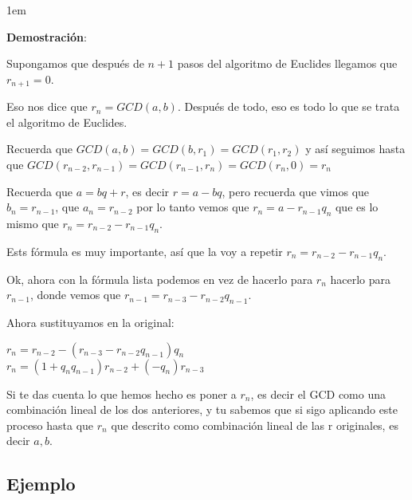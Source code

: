 \documentclass[12pt, fleqn]{report}                             %
\newenvironment{SmallIndentation}[1][0.75em]                    %
    {\begin{adjustwidth}{#1}{}\begin{footnotesize}}                 %
    {\end{footnotesize}\end{adjustwidth}}                           %
\begin{document}
            \begin{SmallIndentation}[1em]
                \textbf{Demostración}:

                Supongamos que después de $n+1$ pasos del algoritmo de Euclides llegamos que
                $r_{n+1}=0$.

                Eso nos dice que $r_n=GCD(a,b)$. Después de todo, eso es todo lo que se
                trata el algoritmo de Euclides.

                Recuerda que $GCD(a,b) = GCD(b,r_1) = GCD(r_1,r_2)$ y así seguimos hasta que
                $GCD(r_{n-2},r_{n-1}) = GCD(r_{n-1},r_n) = GCD(r_n,0) = r_n$

                Recuerda que $a=bq+r$, es decir $r=a-bq$, pero recuerda que vimos que
                $b_n = r_{n-1}$, que $a_n=r_{n-2}$ por lo tanto vemos que
                $r_n=a-r_{n-1}q_n$ que es lo mismo que  $r_n = r_{n-2} - r_{n-1}q_n$.

                Ests fórmula es muy importante, así que la voy a repetir $r_n = r_{n-2} - r_{n-1}q_n$.

                Ok, ahora con la fórmula lista podemos en vez de hacerlo para $r_n$ hacerlo para
                $r_{n-1}$, donde vemos que $r_{n-1} = r_{n-3} - r_{n-2}q_{n-1}$.

                Ahora sustituyamos en la original:

                $r_n = r_{n-2} - (r_{n-3} - r_{n-2}q_{n-1})q_n$\\
                $r_n = (1+q_n q_{n-1})r_{n-2} + (-q_n)r_{n-3}$

                Si te das cuenta lo que hemos hecho es poner a $r_n$, es decir el GCD como
                una combinación lineal de los dos anteriores, y tu sabemos que si sigo
                aplicando este proceso hasta que $r_n$ que descrito como combinación 
                lineal de las r originales, es decir $a,b$.

            \end{SmallIndentation}






        \clearpage
        \subsection{Ejemplo}
\end{document}
